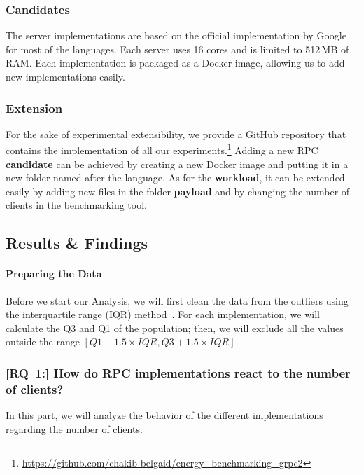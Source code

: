 \subsubsection*{Candidates}
The server implementations are based on the official implementation by Google for most of the languages.
Each server uses 16 cores and is limited to 512\,MB of RAM.
Each implementation is packaged as a Docker image, allowing us to add new implementations easily.

\subsubsection{Extension}
For the sake of experimental extensibility, we provide a GitHub repository that contains the implementation of all our experiments.\footnote{\url{https://github.com/chakib-belgaid/energy_benchmarking_grpc2}}
Adding a new RPC \textbf{candidate} can be achieved by creating a new Docker image and putting it in a new folder named after the language.
As for the \textbf{workload}, it can be extended easily by adding new files in the folder \textbf{payload} and by changing the number of clients in the benchmarking tool.


\subsection{Results \& Findings}
\paragraph{Preparing the Data}
Before we start our Analysis, we will first clean the data from the outliers using the interquartile range (IQR) method~\cite{leys2013detecting}.
For each implementation, we will calculate the Q3 and Q1 of the population; then, we will exclude all the values outside the range
$ [Q1 - 1.5 \times IQR, Q3 + 1.5 \times IQR ]$.

\subsubsection{[\textsc{RQ}~1:] How do RPC implementations react to the number of clients?}

In this part, we will analyze the behavior of the different implementations regarding the number of clients.

